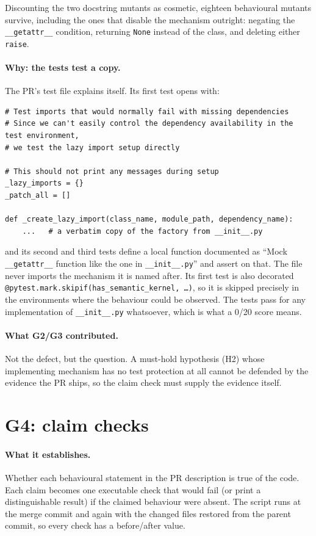 \documentclass[11pt,a4paper]{article}
\newcommand{\code}[1]{\texttt{#1}}
\begin{document}
Discounting the two docstring mutants as cosmetic, eighteen behavioural mutants survive, including the ones that disable the mechanism outright: negating the \code{\_\_getattr\_\_} condition, returning \code{None} instead of the class, and deleting either \code{raise}.

\paragraph{Why: the tests test a copy.} The PR's test file explains itself. Its first test opens with:
\begin{lstlisting}
# Test imports that would normally fail with missing dependencies
# Since we can't easily control the dependency availability in the test environment,
# we test the lazy import setup directly

# This should not print any messages during setup
_lazy_imports = {}
_patch_all = []

def _create_lazy_import(class_name, module_path, dependency_name):
    ...   # a verbatim copy of the factory from __init__.py
\end{lstlisting}
and its second and third tests define a local function documented as ``Mock \code{\_\_getattr\_\_} function like the one in \code{\_\_init\_\_.py}'' and assert on that. The file never imports the mechanism it is named after. Its first test is also decorated \code{@pytest.mark.skipif(has\_semantic\_kernel, \ldots)}, so it is skipped precisely in the environments where the behaviour could be observed. The tests pass for any implementation of \code{\_\_init\_\_.py} whatsoever, which is what a 0/20 score means.

\paragraph{What G2/G3 contributed.} Not the defect, but the question. A must-hold hypothesis (H2) whose implementing mechanism has no test protection at all cannot be defended by the evidence the PR ships, so the claim check must supply the evidence itself.

\section{G4: claim checks}
\label{sec:g4}
\paragraph{What it establishes.} Whether each behavioural statement in the PR description is true of the code. Each claim becomes one executable check that would fail (or print a distinguishable result) if the claimed behaviour were absent. The script runs at the merge commit and again with the changed files restored from the parent commit, so every check has a before/after value.
\end{document}
